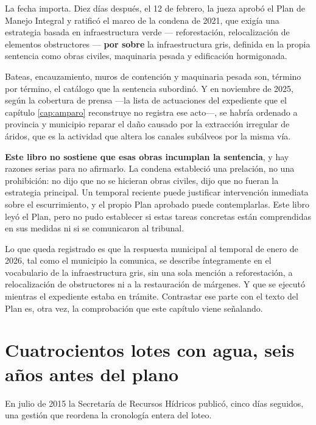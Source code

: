 \begin{cautela}
La fecha importa. Diez días después, el 12 de febrero, la jueza aprobó el Plan de Manejo Integral y ratificó el marco de la condena de 2021, que exigía una estrategia basada en infraestructura verde --- reforestación, relocalización de elementos obstructores --- \textbf{por sobre} la infraestructura gris, definida en la propia sentencia como obras civiles, maquinaria pesada y edificación hormigonada.

Bateas, encauzamiento, muros de contención y maquinaria pesada son, término por término, el catálogo que la sentencia subordinó. Y en noviembre de 2025, según la cobertura de prensa ---la lista de actuaciones del expediente que el capítulo \ref{cap:amparo} reconstruye no registra ese acto---, se habría ordenado a provincia y municipio reparar el daño causado por la extracción irregular de áridos, que es la actividad que altera los canales subálveos por la misma vía.

\textbf{Este libro no sostiene que esas obras incumplan la sentencia}, y hay razones serias para no afirmarlo. La condena estableció una prelación, no una prohibición: no dijo que no se hicieran obras civiles, dijo que no fueran la estrategia principal. Un temporal reciente puede justificar intervención inmediata sobre el escurrimiento, y el propio Plan aprobado puede contemplarlas. Este libro leyó el Plan, pero no pudo establecer si estas tareas concretas están comprendidas en sus medidas ni si se comunicaron al tribunal.

Lo que queda registrado es que la respuesta municipal al temporal de enero de 2026, tal como el municipio la comunica, se describe íntegramente en el vocabulario de la infraestructura gris, sin una sola mención a reforestación, a relocalización de obstructores ni a la restauración de márgenes. Y que se ejecutó mientras el expediente estaba en trámite. Contrastar ese parte con el texto del Plan es, otra vez, la comprobación que este capítulo viene señalando.
\end{cautela}

\section{Cuatrocientos lotes con agua, seis años antes del plano}

En julio de 2015 la Secretaría de Recursos Hídricos publicó, cinco días seguidos, una gestión que reordena la cronología entera del loteo.

